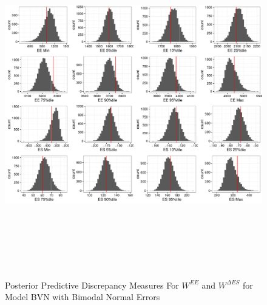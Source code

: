 \documentclass[11pt]{article}\usepackage[]{graphicx}\usepackage[]{color}
\begin{document}
  \begin{figure}
  \centering
  \includegraphics[width=17cm,height=15cm]{manual_figure/wpwdiagbvnb.pdf}
  \caption{Posterior Predictive Discrepancy Measures For $W^{EE}$ and $W^{\Delta ES}$ for Model BVN with Bimodal Normal Errors}
  \label{wpwdiagbvnb}
  \end{figure}
\end{document}
